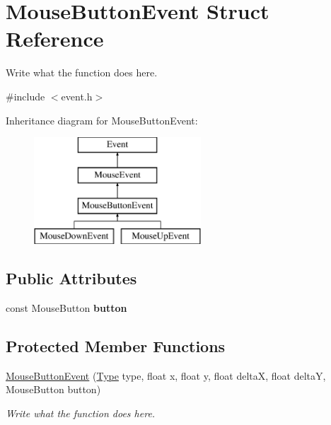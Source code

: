\hypertarget{structMouseButtonEvent}{\section{Mouse\+Button\+Event Struct Reference}
\label{structMouseButtonEvent}
}


Write what the function does here.  




{\ttfamily \#include $<$event.\+h$>$}

Inheritance diagram for Mouse\+Button\+Event\+:\begin{figure}[H]
\begin{center}
\leavevmode
\includegraphics[height=4.000000cm]{structMouseButtonEvent}
\end{center}
\end{figure}
\subsection*{Public Attributes}
\begin{DoxyCompactItemize}
\item 
\hypertarget{structMouseButtonEvent_a91b45a7119f6cae5454b083b9c1d99c1}{const Mouse\+Button {\bfseries button}}\label{structMouseButtonEvent_a91b45a7119f6cae5454b083b9c1d99c1}

\end{DoxyCompactItemize}
\subsection*{Protected Member Functions}
\begin{DoxyCompactItemize}
\item 
\hyperlink{structMouseButtonEvent_a1dd634033a88534d5bedb2dee0f4299a}{Mouse\+Button\+Event} (\hyperlink{classEvent_a2abf13b5be49315e9e362af02029f058}{Type} type, float x, float y, float delta\+X, float delta\+Y, Mouse\+Button button)
\begin{DoxyCompactList}\small\item\em Write what the function does here. \end{DoxyCompactList}\end{DoxyCompactItemize}
